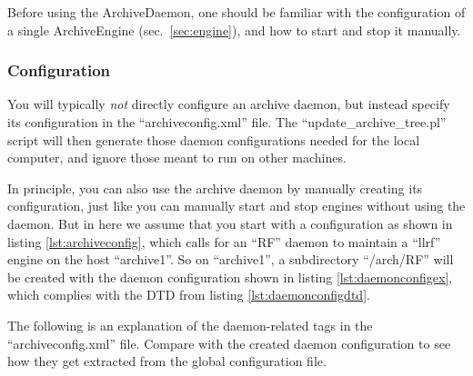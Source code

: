 Before using the ArchiveDaemon, one should be familiar
with the configuration of a single ArchiveEngine (sec.\ \ref{sec:engine}),
and how to start and stop it manually.



\subsubsection{Configuration}
You will typically \emph{not} directly configure an archive daemon,
but instead specify its configuration in the ``archiveconfig.xml''
file. The ``update\_archive\_tree.pl'' script will then generate
those daemon configurations needed for the local computer, and ignore
those meant to run on other machines.
\clearpage

In principle, you can also use the archive daemon by manually creating
its configuration, just like you can manually start and stop engines
without using the daemon. But in here we assume that you start with a
configuration as shown in listing \ref{lst:archiveconfig},
which calls for an ``RF'' daemon to maintain a ``llrf'' engine on the host
``archive1''. So on ``archive1'', a subdirectory ``/arch/RF'' will be
created with the daemon configuration shown in listing 
\ref{lst:daemonconfigex}, which complies with the DTD from listing
\ref{lst:daemonconfigdtd}.

The following is an explanation of the daemon-related tags in the
``archiveconfig.xml'' file. Compare with the created daemon
configuration to see how they get extracted from the global
configuration file.

